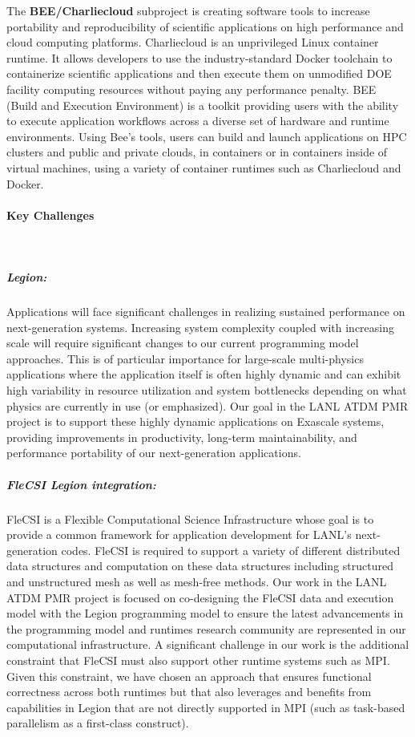 The \textbf{BEE/Charliecloud} subproject is creating software tools to increase portability
and reproducibility of scientific applications on high performance and cloud
computing platforms.  Charliecloud \cite{priedhorskyrrandlestc2016} is an unprivileged Linux container
runtime.  It allows developers to use the industry-standard Docker
\cite{dockerinc}
toolchain to containerize scientific applications and then execute them on
unmodified DOE facility computing resources without paying any performance
penalty.  BEE \cite{beeproject} (Build and Execution Environment) is a toolkit providing
users with the ability to execute application workflows across a diverse set of
hardware and runtime environments.  Using Bee's tools, users can build and
launch applications on HPC clusters and public and private clouds, in
containers or in containers inside of virtual machines, using a variety of
container runtimes such as Charliecloud and Docker. 



\paragraph{Key  Challenges} \leavevmode \\

\subparagraph{Legion:}

Applications will face significant challenges in realizing sustained performance on next-generation systems. Increasing system complexity coupled with increasing scale will require significant changes to our current programming model approaches. This is of particular importance for large-scale multi-physics applications where the application itself is often highly dynamic and can exhibit high variability in resource utilization and system bottlenecks depending on what physics are currently in use (or emphasized). Our goal in the LANL ATDM PMR project is to support these highly dynamic applications on Exascale systems, providing improvements in productivity, long-term maintainability, and performance portability of our next-generation applications. 

\subparagraph{FleCSI Legion integration:}
FleCSI is a Flexible Computational Science Infrastructure whose goal is to provide a common framework for application development for LANL's next-generation codes. FleCSI is required to support a variety of different distributed data structures and computation on these data structures including structured and unstructured mesh as well as mesh-free methods. Our work in the LANL ATDM PMR project is focused on co-designing the FleCSI data and execution model with the Legion programming model to ensure the latest advancements in the programming model and runtimes research community are represented in our computational infrastructure. A significant challenge in our work is the additional constraint that FleCSI must also support other runtime systems such as MPI. Given this constraint, we have chosen an approach that ensures functional correctness across both runtimes but that also leverages and benefits from capabilities in Legion that are not directly supported in MPI (such as task-based parallelism as a first-class construct). 

